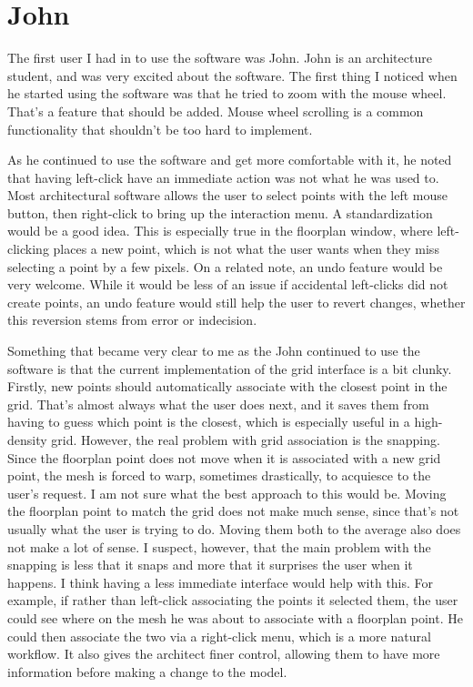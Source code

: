 \documentclass{thesis}
\begin{document}
\section{John}
The first user I had in to use the software was John.  John is an architecture student, and was very excited about the software.
The first thing I noticed when he started using the software was that he tried to zoom with the mouse wheel.  That's a feature that
should be added.  Mouse wheel scrolling is a common functionality that shouldn't be too hard to implement.

As he continued to use the software and get more comfortable with it, he noted that having left-click have an immediate action was not
what he was used to. Most architectural software allows the user to select points with the left mouse button, then right-click to
bring up the interaction menu.  A standardization would be a good idea.  This is especially true in the floorplan window, where
left-clicking places a new point, which is not what the user wants when they miss selecting a point by a few pixels.  On a related
note, an undo feature would be very welcome.  While it would be less of an issue if accidental left-clicks did not create points,
an undo feature would still help the user to revert changes, whether this reversion stems from error or indecision.

Something that became very clear to me as the John continued to use the software is that the current implementation of the grid
interface is a bit clunky.  Firstly, new points should automatically associate with the closest point in the grid.  That's almost
always what the user does next, and it saves them from having to guess which point is the closest, which is especially useful in a
high-density grid.  However, the real problem with grid association is the snapping.  Since the floorplan point does not move when
it is associated with a new grid point, the mesh is forced to warp, sometimes drastically, to acquiesce to the user's request.
I am not sure what the best approach to this would be.  Moving the floorplan point to match the grid does not make much sense,
since that's not usually what the user is trying to do.  Moving them both to the average also does not make a lot of sense.
I suspect, however, that the main problem with the snapping is less that it snaps and more that it surprises the user when it
happens.  I think having a less immediate interface would help with this.  For example, if rather than left-click associating the
points it selected them, the user could see where on the mesh he was about to associate with a floorplan point.  He could then
associate the two via a right-click menu, which is a more natural workflow.  It also gives the architect finer control, allowing
them to have more information before making a change to the model.
\end{document}
